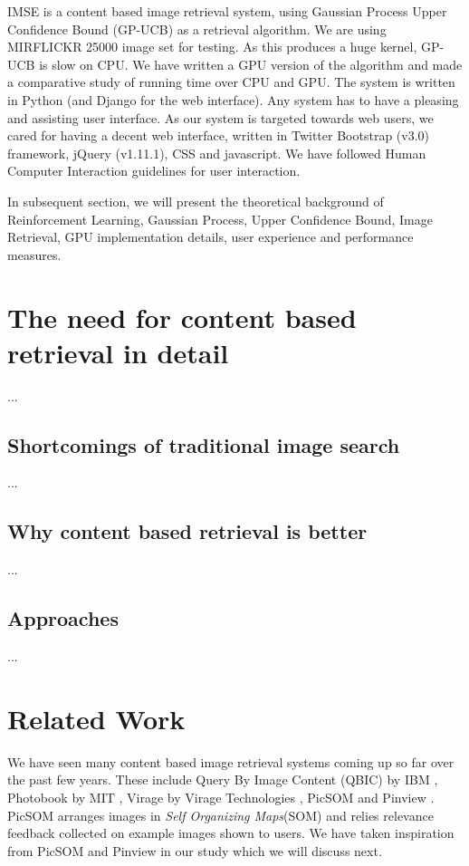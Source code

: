 \documentclass[english]{tktltiki}
\begin{document}
IMSE is a content based image retrieval system, using Gaussian Process Upper Confidence Bound (GP-UCB) as a retrieval algorithm. We are using MIRFLICKR 25000 \cite{mirflickr} image set for testing. As this produces a huge kernel, GP-UCB is slow on CPU. We have written a GPU version of the algorithm and made a comparative study of running time over CPU and GPU. The system is written in Python (and Django for the web interface). Any system has to have a pleasing and assisting user interface. As our system is targeted towards web users, we cared for having a decent web interface, written in Twitter Bootstrap (v3.0) framework, jQuery (v1.11.1), CSS and javascript. We have followed Human Computer Interaction guidelines for user interaction.

In subsequent section, we will present the theoretical background of Reinforcement Learning, Gaussian Process, Upper Confidence Bound, Image Retrieval, GPU implementation details, user experience and performance measures.


\section{The need for content based retrieval in detail}

...

\subsection{Shortcomings of traditional image search}

...

\subsection{Why content based retrieval is better}


...


\subsection{Approaches}

...

\fi


\section{Related Work}

We have seen many content based image retrieval systems coming up so far over the past few years. These include Query By Image Content (QBIC) by IBM \cite{QBIC}, Photobook by MIT \cite{Photobook}, Virage by Virage Technologies \cite{Virage}, PicSOM \cite{PicSOM} and Pinview \cite{Pinview}. PicSOM arranges images in \textit{Self Organizing Maps}(SOM) \cite{SOM} and relies relevance feedback collected on example images shown to users. We have taken inspiration from PicSOM and Pinview in our study which we will discuss next.
\end{document}

